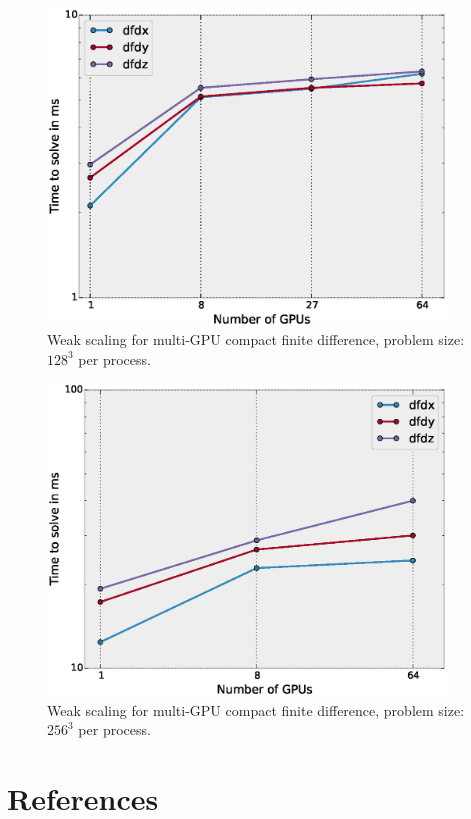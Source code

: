 \documentclass{elsarticle}
\begin{document}
\begin{figure}[h!]
\begin{center}
\includegraphics[width=300pt]{fig/weak-scaling-128.eps}
\caption{Weak scaling for multi-GPU compact finite difference, problem size: $128^3$ per process.}
\label{fig:weak-scaling-128}
\end{center}
\end{figure}

\begin{figure}[h!]
\begin{center}
\includegraphics[width=300pt]{fig/weak-scaling-256.eps}
\caption{Weak scaling for multi-GPU compact finite difference, problem size: $256^3$ per process.}
\label{fig:weak-scaling-256}
\end{center}
\end{figure}

\pagebreak[4]
\section*{References}



\end{document}
